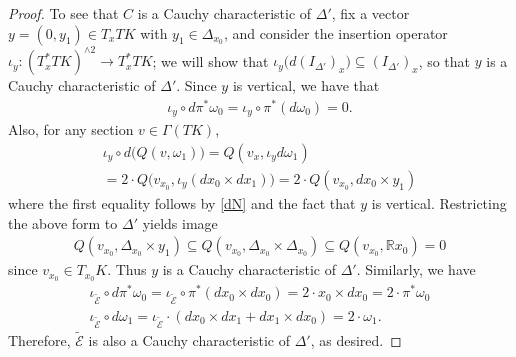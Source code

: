 \documentclass[11pt,letterpaper]{amsart}
\numberwithin{equation}{section}
\newcommand{\oct}{\hat{\mathbbm{O}}}
\newcommand{\ve}{\varepsilon}
\begin{document}
\begin{proof}
To see that $C$ is a Cauchy characteristic of $\Delta'$, fix a vector $y = (0,y_1)\in T_xTK$ with $y_1\in\Delta_{x_0}$, and consider the insertion operator $\iota_y:(T^*_xTK)^{\wedge 2}\to T_x^*TK$; we will show that $\iota_y\big(d(I_{\Delta'})_x\big) \subseteq (I_{\Delta'})_x$, so that $y$ is a Cauchy characteristic of $\Delta'$. Since $y$ is vertical, we have that
\begin{align}
    \iota_y\circ d\pi^*\omega_0 = \iota_y\circ \pi^*(d\omega_0) = 0.
\end{align}
Also, for any section $v\in \Gamma(TK)$, 
\begin{gather}
    \iota_y \circ d\big(Q(v,\omega_1)\big) = Q(v_x,\iota_y d\omega_1) 
    \\
    = 2\cdot Q\big(v_{x_0},\iota_y(dx_0\times dx_1)\big) = 2\cdot Q(v_{x_0},dx_0\times y_1)
\end{gather}
where the first equality follows by \eqref{dN} and the fact that $y$ is vertical. Restricting the above form to $\Delta'$ yields image
\begin{gather}
    Q(v_{x_0},\Delta_{x_0}\times y_1) \subseteq Q(v_{x_0},\Delta_{x_0}\times \Delta_{x_0}) \subseteq Q(v_{x_0},\mathbb{R}x_0) = 0
\end{gather}
since $v_{x_0}\in T_{x_0}K$. Thus $y$ is a Cauchy characteristic of $\Delta'$. Similarly, we have
\begin{gather}
    \iota_{\tilde{\mathcal{E}}}\circ d\pi^*\omega_0 = \iota_{\tilde{\mathcal{E}}}\circ \pi^*(dx_0\times dx_0) = 2 \cdot x_0\times dx_0 = 2\cdot \pi^*\omega_0
    \\
    \iota_{\tilde{\mathcal{E}}}\circ d\omega_1 = \iota_{\tilde{\mathcal{E}}}\cdot(dx_0\times dx_1 + dx_1\times dx_0) = 2\cdot \omega_1.
\end{gather}
Therefore, $\tilde{\mathcal{E}}$ is also a Cauchy characteristic of $\Delta'$, as desired.
\end{proof}

\end{document}
